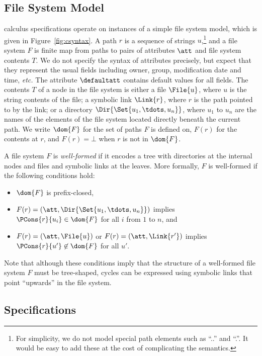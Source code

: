 \subsection{File System Model}

\forest{} calculus specifications operate on instances of a simple
file system model, which is given in Figure~\ref{fig:csyntax}. A path
$r$ is a sequence of strings $u$,\footnote{For simplicity, we do not
  model special path elements such as ``..'' and ``.''.  It would be
  easy to add these at the cost of complicating the semantics.} and a
file system $F$ is finite map from paths to pairs of attributes $\att$
and file system contents $T$.  We do not specify the syntax of
attributes precisely, but expect that they represent the usual fields
including owner, group, modification date and time, {\it etc.} The
attribute $\defaultatt$ contains default values for all fields. The
contents $T$ of a node in the file system is either a file $\File{u}$,
where $u$ is the string contents of the file; a symbolic link
$\Link{r}$, where $r$ is the path pointed to by the link; or a
directory $\Dir{\Set{u_1,\tdots,u_n}}$, where $u_1$ to $u_n$ are the
names of the elements of the file system located directly beneath the
current path. We write $\dom{F}$ for the set of paths $F$ is defined
on, $F(r)$ for the contents at $r$, and $F(r) = \bot$ when $r$ is not
in $\dom{F}$.

A file system $F$ is {\em well-formed} if it encodes a tree with
directories at the internal nodes and files and symbolic links at the
leaves. More formally, $F$ is well-formed if the following conditions
hold:
%
\begin{itemize}
\item $\dom{F}$ is prefix-closed,
\item $F(r) = (\att,\Dir{ \Set{u_1,\tdots,u_n} })$ implies
  $\PCons{r}{u_i} \in \dom{F}$ for all $i$ from $1$ to $n$, and
\item $F(r) = (\att,\File{u})$ or $F(r) = (\att,\Link{r'})$ implies
  $\PCons{r}{u'} \not\in \dom{F}$ for all $u'$.
\end{itemize}
%
Note that although these conditions imply that the structure of a
well-formed file system $F$ must be tree-shaped, cycles can be
expressed using symbolic links that point ``upwards'' in the file
system.

\subsection{Specifications}

